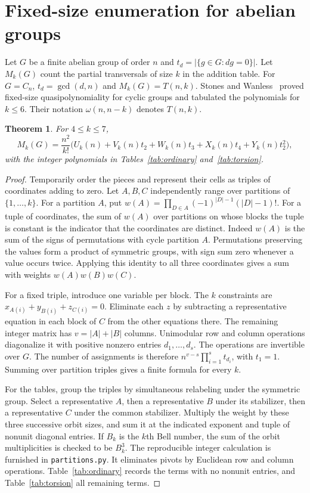 \documentclass[11pt]{article}
\newtheorem{theorem}{Theorem}
\newcommand{\card}[1]{\lvert #1\rvert}
\begin{document}
\section{Fixed-size enumeration for abelian groups}
Let $G$ be a finite abelian group of order $n$ and $t_d=\card{\{g\in G:dg=0\}}$. Let $M_k(G)$ count the partial transversals of size $k$ in the addition table. For $G=C_n$, $t_d=\gcd(d,n)$ and $M_k(G)=T(n,k)$. Stones and Wanless~\cite{partial} proved fixed-size quasipolynomiality for cyclic groups and tabulated the polynomials for $k\le6$. Their notation $\omega(n,n-k)$ denotes $T(n,k)$.
\begin{theorem}\label{thm:coeff}
For $4\le k\le7$,
\[
 M_k(G)=\frac{n^2}{k!}\big(U_k(n)+V_k(n)t_2+W_k(n)t_3+X_k(n)t_4+Y_k(n)t_2^2\big),
\]
with the integer polynomials in Tables~\ref{tab:ordinary} and~\ref{tab:torsion}.
\end{theorem}
\begin{proof}
Temporarily order the pieces and represent their cells as triples of coordinates adding to zero. Let $A,B,C$ independently range over partitions of $\{1,\dots,k\}$. For a partition $A$, put $w(A)=\prod_{D\in A}(-1)^{|D|-1}(|D|-1)!$. For a tuple of coordinates, the sum of $w(A)$ over partitions on whose blocks the tuple is constant is the indicator that the coordinates are distinct. Indeed $w(A)$ is the sum of the signs of permutations with cycle partition $A$. Permutations preserving the values form a product of symmetric groups, with sign sum zero whenever a value occurs twice. Applying this identity to all three coordinates gives a sum with weights $w(A)w(B)w(C)$.

For a fixed triple, introduce one variable per block. The $k$ constraints are $x_{A(i)}+y_{B(i)}+z_{C(i)}=0$. Eliminate each $z$ by subtracting a representative equation in each block of $C$ from the other equations there. The remaining integer matrix has $v=|A|+|B|$ columns. Unimodular row and column operations diagonalize it with positive nonzero entries $d_1,\dots,d_s$. The operations are invertible over $G$. The number of assignments is therefore $n^{v-s}\prod_{i=1}^s t_{d_i}$, with $t_1=1$. Summing over partition triples gives a finite formula for every $k$.

For the tables, group the triples by simultaneous relabeling under the symmetric group. Select a representative $A$, then a representative $B$ under its stabilizer, then a representative $C$ under the common stabilizer. Multiply the weight by these three successive orbit sizes, and sum it at the indicated exponent and tuple of nonunit diagonal entries. If $B_k$ is the $k$th Bell number, the sum of the orbit multiplicities is checked to be $B_k^3$. The reproducible integer calculation is furnished in \texttt{partitions.py}. It eliminates pivots by Euclidean row and column operations. Table~\ref{tab:ordinary} records the terms with no nonunit entries, and Table~\ref{tab:torsion} all remaining terms.
\end{proof}
\end{document}
